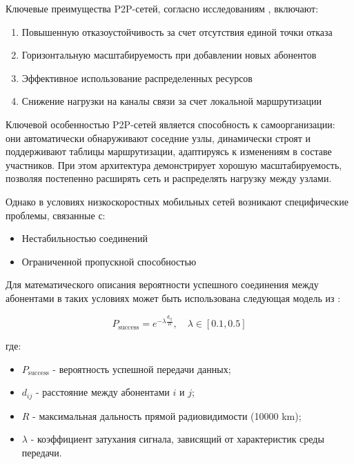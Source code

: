 Ключевые преимущества P2P-сетей, согласно исследованиям \cite{schollmeier2002peer}, включают:

\begin{enumerate}
\item Повышенную отказоустойчивость за счет отсутствия единой точки отказа
\item Горизонтальную масштабируемость при добавлении новых абонентов
\item Эффективное использование распределенных ресурсов
\item Снижение нагрузки на каналы связи за счет локальной маршрутизации
\end{enumerate}

Ключевой особенностью P2P-сетей является способность к самоорганизации: они автоматически обнаруживают соседние узлы, динамически строят и поддерживают 
таблицы маршрутизации, адаптируясь к изменениям в составе участников. При этом архитектура демонстрирует хорошую масштабируемость, позволяя постепенно 
расширять сеть и распределять нагрузку между узлами.

Однако в условиях низкоскоростных мобильных сетей возникают специфические проблемы, связанные с:

\begin{itemize}
\item Нестабильностью соединений
\item Ограниченной пропускной способностью
\end{itemize}

Для математического описания вероятности успешного соединения между абонентами в таких условиях может быть использована следующая модель из 
\cite{goldsmith2005wireless}:

\begin{equation}
\label{eq:connection-prob}
P_{\text{success}} = e^{-\lambda \frac{d_{ij}}{R}}, \quad \lambda \in [0.1, 0.5]
\end{equation}

где:
\begin{itemize}
\item $P_{\text{success}}$ - вероятность успешной передачи данных;
\item $d_{ij}$ - расстояние между абонентами $i$ и $j$;
\item $R$ - максимальная дальность прямой радиовидимости (10000 km);
\item $\lambda$ - коэффициент затухания сигнала, зависящий от характеристик среды передачи.
\end{itemize}

